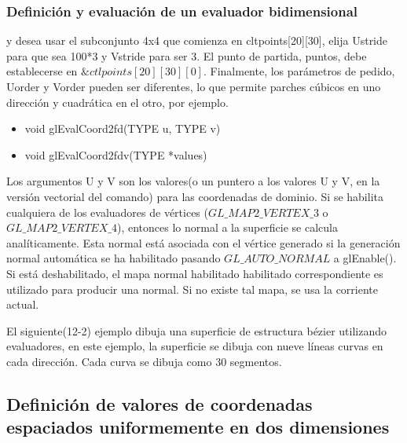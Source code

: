 \documentclass[10.5pt]{beamer}
\begin{document}
\begin{frame}[fragile]
    \frametitle{Definición y evaluación de un evaluador bidimensional}
    y desea usar el subconjunto 4x4 que comienza en cltpoints[20][30], elija Ustride para que sea 100*3 y
    Vstride para ser 3. El punto de partida, puntos, debe establecerse en $\&ctlpoints[20][30][0]$. Finalmente,
    los parámetros de pedido, Uorder y Vorder pueden ser diferentes, lo que permite parches cúbicos en uno
    dirección y cuadrática en el otro, por ejemplo.

    \begin{itemize}
        \item void glEvalCoord2{fd}(TYPE u, TYPE v)
        \item void glEvalCoord2{fd}v(TYPE *values)
    \end{itemize}
    
\end{frame}

\begin{frame}[fragile]
     Los argumentos U y V son los valores(o un puntero a los valores U y V, en la versión vectorial del comando) para las coordenadas de dominio.
    Si se habilita cualquiera de los evaluadores de vértices ($ GL\_MAP2\_VERTEX\_3 $ o $ GL\_MAP2\_VERTEX\_4 $),
    entonces lo normal a la superficie se calcula analíticamente. Esta normal está asociada con el
    vértice generado si la generación normal automática se ha habilitado pasando
    $GL\_AUTO\_NORMAL$ a glEnable(). Si está deshabilitado, el mapa normal habilitado habilitado correspondiente es
    utilizado para producir una normal. Si no existe tal mapa, se usa la corriente actual.
    
    El siguiente(12-2) ejemplo dibuja una superficie de estructura bézier utilizando evaluadores, en este 
    ejemplo, la superficie se dibuja con nueve líneas curvas en cada dirección. Cada curva se dibuja como 30
    segmentos.
    
\end{frame}

\subsection{Definición de valores de coordenadas espaciados uniformemente en dos dimensiones}
\end{document}
